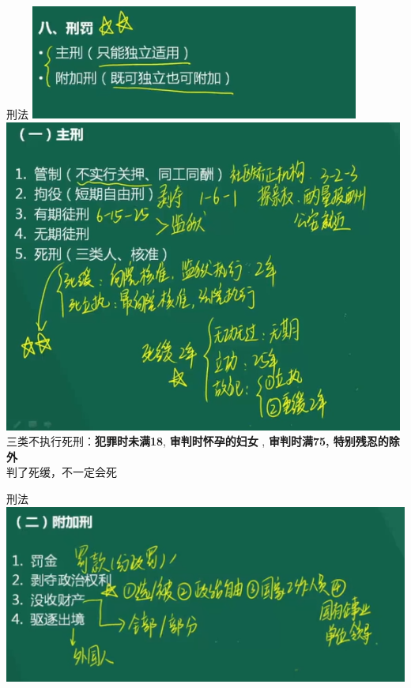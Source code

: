 \documentclass[aspectratio=169]{beamer}
\begin{document}
\begin{frame}[t]{刑法}
    \includegraphics[scale=0.3]{punishment}
    \includegraphics[scale=0.3]{main_punishment}\\
    三类不执行死刑：\textbf{犯罪时未满18}, \textbf{审判时怀孕的妇女} , \textbf{审判时满75, 特别残忍的除外}\\
    判了死缓，不一定会死
    
\end{frame}



\begin{frame}[t]{刑法}
    \includegraphics[scale=0.6]{accessory_punishment}\\ 
\end{frame}
\end{document}
